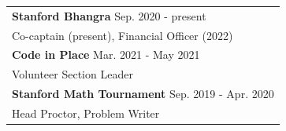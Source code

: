 \begin{longtable}{p{}}
\textbf{Stanford Bhangra} \hfill Sep. 2020 - present \\
Co-captain (present), Financial Officer (2022) \\[0.5em]
\textbf{Code in Place} \hfill Mar. 2021 - May 2021 \\
Volunteer Section Leader \\[0.5em]
\textbf{Stanford Math Tournament} \hfill Sep. 2019 - Apr. 2020 \\
Head Proctor, Problem Writer
\end{longtable}